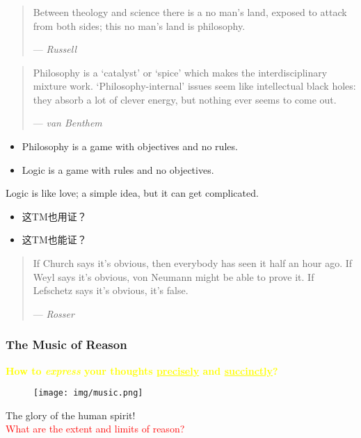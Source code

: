 \documentclass[UTF8,11pt,colorlinks,compress,openany]{beamer}%
\begin{document}
\begin{frame}\frametitle{}
\begin{quote}
Between theology and science there is a no man's land, exposed to attack from both sides; this no man's land is philosophy.\par\hfill --- \textsl{Russell}
\end{quote}
\begin{quote}
Philosophy is a `catalyst' or `spice' which makes the interdisciplinary mixture work. `Philosophy-internal' issues seem like intellectual black holes: they absorb a lot of clever energy, but nothing ever seems to come out.\par\hfill --- \textsl{van Benthem}
\end{quote}
	\begin{itemize}
		\item Philosophy is a game with objectives and no rules.
		\item Logic is a game with rules and no objectives. 
	\end{itemize}
	\begin{block}{Logic is like love; a simple idea, but it can get complicated.}
		\begin{itemize}
			\item 这TM也用证？
			\item 这TM也能证？
		\end{itemize}
	\end{block}
	\begin{quote}
		If Church says it's obvious, then everybody has seen it half an hour ago. If Weyl says it's obvious, von Neumann might be able to prove it. If Lefschetz says it's obvious, it's false.\par\hfill --- \textsl{Rosser}
	\end{quote}
\end{frame}

\begin{frame}\frametitle{The Music of Reason}
	\begin{center}
		\large{\textcolor{yellow}{\textbf{How to \textit{express} your thoughts \underline{precisely} and \underline{succinctly}?}}}
	\end{center}
	\begin{figure}
		\texttt{[image: img/music.png]}
	\end{figure}
	\begin{center}
	The glory of the human spirit!\\
	\large{\textcolor{red}{What are the extent and limits of reason?}}
	\end{center}
\end{frame}
\end{document}
